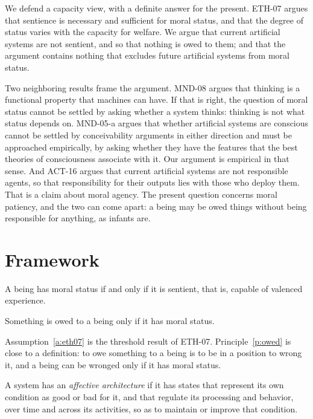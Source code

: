 \documentclass{situationist-preprint}
\begin{document}
We defend a capacity view, with a definite answer for the present. ETH-07 argues that sentience is necessary and sufficient for moral status, and that the degree of status varies with the capacity for welfare. We argue that current artificial systems are not sentient, and so that nothing is owed to them; and that the argument contains nothing that excludes future artificial systems from moral status.

Two neighboring results frame the argument. MND-08 argues that thinking is a functional property that machines can have. If that is right, the question of moral status cannot be settled by asking whether a system thinks: thinking is not what status depends on. MND-05-a argues that whether artificial systems are conscious cannot be settled by conceivability arguments in either direction and must be approached empirically, by asking whether they have the features that the best theories of consciousness associate with it. Our argument is empirical in that sense. And ACT-16 argues that current artificial systems are not responsible agents, so that responsibility for their outputs lies with those who deploy them. That is a claim about moral agency. The present question concerns moral patiency, and the two can come apart: a being may be owed things without being responsible for anything, as infants are.

\section{Framework}

\begin{assumption}\label{a:eth07}
A being has moral status if and only if it is sentient, that is, capable of valenced experience.
\end{assumption}

\begin{principle}\label{p:owed}
Something is owed to a being only if it has moral status.
\end{principle}

Assumption~\ref{a:eth07} is the threshold result of ETH-07. Principle~\ref{p:owed} is close to a definition: to owe something to a being is to be in a position to wrong it, and a being can be wronged only if it has moral status.

\begin{definition}\label{d:affect}
A system has an \emph{affective architecture} if it has states that represent its own condition as good or bad for it, and that regulate its processing and behavior, over time and across its activities, so as to maintain or improve that condition.
\end{definition}
\end{document}
